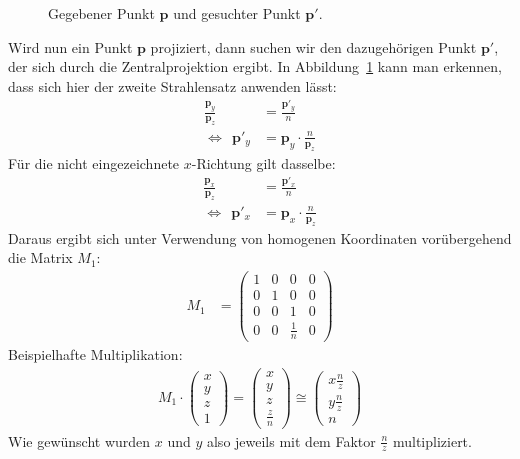 \documentclass[a4paper,parskip=full*]{scrartcl}
\newcommand{\bvec}[1]{\ensuremath{\mathbf{#1}}}
\begin{document}
\begin{figure}[h]
	\centering
	
	\caption%
	{Gegebener Punkt $\bvec{p}$ und gesuchter Punkt $\bvec{p}'$.}

	\label{projy}
\end{figure}

Wird nun ein Punkt $\bvec{p}$ projiziert, dann suchen wir den
dazugehörigen Punkt $\bvec{p}'$, der sich durch die Zentralprojektion
ergibt. In Abbildung~\ref{projy} kann man erkennen, dass sich hier der
zweite Strahlensatz anwenden lässt:
\begin{align*}
	\frac{\bvec{p}_y}{\bvec{p}_z} &= \frac{\bvec{p}'_y}{n}  \\
              \iff ~~ \bvec{p}'_y &= \bvec{p}_y \cdot \frac{n}{\bvec{p}_z}
\end{align*}
Für die nicht eingezeichnete $x$-Richtung gilt dasselbe:
\begin{align*}
	\frac{\bvec{p}_x}{\bvec{p}_z} &= \frac{\bvec{p}'_x}{n}  \\
              \iff ~~ \bvec{p}'_x &= \bvec{p}_x \cdot \frac{n}{\bvec{p}_z}
\end{align*}
Daraus ergibt sich unter Verwendung von homogenen Koordinaten
vorübergehend die Matrix $M_1$:
\begin{align*}
	M_1 &= 
	\begin{pmatrix}
		1 & 0 & 0 & 0  \\
		0 & 1 & 0 & 0  \\
		0 & 0 & 1 & 0  \\
		0 & 0 & \frac{1}{n} & 0
	\end{pmatrix}
\end{align*}
Beispielhafte Multiplikation:
\begin{align*}
	M_1 \cdot \begin{pmatrix} x \\ y \\ z \\ 1 \end{pmatrix} =
	\begin{pmatrix} x \\ y \\ z \\ \frac{z}{n} \end{pmatrix} \cong
	\begin{pmatrix} x \frac{n}{z} \\ y \frac{n}{z} \\ n \end{pmatrix}
\end{align*}
Wie gewünscht wurden $x$ und $y$ also jeweils mit dem Faktor
$\frac{n}{z}$ multipliziert.
\end{document}
